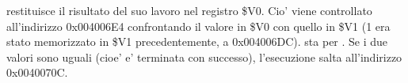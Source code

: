 \scanf restituisce il risultato del suo lavoro nel registro \$V0. Cio' viene controllato all'indirizzo 0x004006E4
confrontando il valore in \$V0 con quello in \$V1 (1 era stato memorizzato in \$V1 precedentemente, a 0x004006DC).
 sta per .
Se i due valori sono uguali (cioe' \scanf e' terminata con successo), l'esecuzione salta all'indirizzo 0x0040070C.

